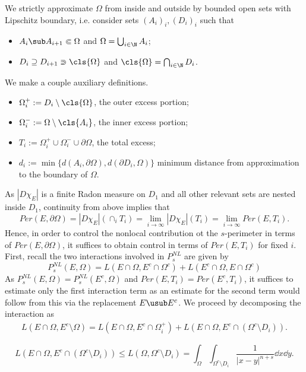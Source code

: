 \documentclass[../main.tex]{subfiles}
\begin{document}
We strictly approximate $ \Omega $ from inside and outside by bounded open sets with Lipschitz boundary, i.e. consider sets $ (A_{i})_{i}, (D_{i})_{i} $ such that
\begin{itemize}
    \item $ A_{i}\sub A_{i+1} \Subset \Omega $ and $ \Omega = \bigcup_{i\in\N}A_{i} $;
    \item $ D_{i}\supseteq D_{i+1}\Supset \cls{\Omega}  $ and $ \cls{\Omega} = \bigcap_{i\in\N}D_{i}$.
\end{itemize}
We make a couple auxiliary definitions.
\begin{itemize}
    \item $ \Omega_{i}^{+} := D_{i}\setminus \cls{\Omega} $, the outer excess portion;
    \item $ \Omega_{i}^{-} := \Omega\setminus \cls{A_{i}} $, the inner excess portion;
    \item $ T_{i}:= \Omega_{i}^{+}\cup \Omega_{i}^{-} \cup \partial \Omega $, the total excess;
    \item $ d_{i}:= \min\{d(A_{i}, \partial \Omega), d(\partial D_{i},  \Omega) \} $ minimum distance from approximation to the boundary of $ \Omega $.
\end{itemize}







As $ |D \chi_{E}| $ is a finite Radon measure on $ D_{1} $ and all other relevant sets are nested inside $ D_{1} $, continuity from above implies that
\[
    Per(E,\partial \Omega) = |D \chi_{E}|(\cap_{i} T_{i}) = \lim_{i\to\infty}|D \chi_{E}|(T_{i}) = \lim_{i\to\infty}Per(E,T_{i}).
\]
Hence, in order to control the nonlocal contribution ot the $ s $-perimeter in terms of $ Per(E,\partial \Omega) $, it suffices to obtain control in terms of $ Per(E,T_{i}) $ for fixed $ i $. First, recall the two interactions involved in $ P_{s}^{NL} $ are given by
\[
    P_{s}^{NL}(E,\Omega) = L(E\cap \Omega, E^{c}\cap \Omega^{c}) + L(E^{c}\cap \Omega, E\cap \Omega^{c})
\]
As $ P_{s}^{NL}(E,\Omega) = P_{s}^{NL}(E^{c},\Omega) $ and $ Per(E,T_{i}) = Per(E^{c},T_{i}) $, it suffices to estimate only the first interaction term as an estimate for the second term would follow from this via the replacement $ E\usub E^{c} $. We proceed by decomposing the interaction as 
\begin{align*}
    L(E\cap \Omega, E^{c}\setminus\Omega) = L(E\cap \Omega, E^{c}\cap \Omega_{i}^{+}) + L(E\cap \Omega, E^{c}\cap (\Omega^{c}\setminus D_{i})).
\end{align*}
\begin{figure}[H]
    \vspace{-5mm}
    
    \vspace{-5mm}
\end{figure}
\[
    L(E\cap \Omega, E^{c}\cap (\Omega^{c}\setminus D_{i})) \leq L(\Omega, \Omega^{c}\setminus D_{i}) = \int_{\Omega}\int_{\Omega^{c}\setminus D_{i}}\frac{1}{|x-y|^{n+s}} \dd{x}\dd{y}.
\]
\end{document}
